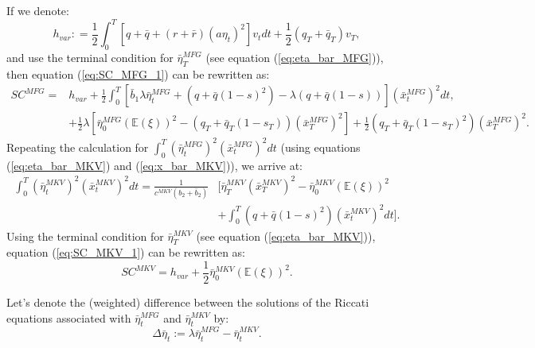 \documentclass[11pt]{article}
\begin{document}
If we denote:
\begin{equation*}
h_{var}: = \frac{1}{2}\int_0^T \left[q+\bar{q}+(r+\bar{r})(a\eta_t)^2\right]v_tdt + \frac{1}{2}(q_T+\bar{q}_T)v_T,
\end{equation*}
and use the terminal condition for $\bar{\eta}^{MFG}_T$ (see equation (\ref{eq:eta_bar_MFG})), then equation (\ref{eq:SC_MFG_1}) can be rewritten as:
\begin{equation}
\begin{split}
SC^{MFG} = & h_{var} +  \frac{1}{2} \int_0^T \left[ \bar{b}_1 \lambda \bar{\eta}_t^{MFG} + (q+ \bar{q}(1-s)^2) - \lambda (q + \bar{q}(1-s)) \right] (\bar{x}_t^{MFG})^2 dt, \\
& + \frac{1}{2} \lambda \left[ \bar{\eta}^{MFG}_0 (\mathbb{E}(\xi))^2 - (q_T+\bar{q}_T(1-s_T)) (\bar{x}_T^{MFG})^2 \right] + \frac{1}{2} (q_T+\bar{q}_T(1-s_T)^2)(\bar{x}_T^{MFG})^2.
\end{split}
\label{eq:SC_MFG_2}
\end{equation}
Repeating the calculation for $\int_0^T (\bar{\eta}^{MFG}_t)^2 (\bar{x}^{MFG}_t)^2 dt$ (using equations (\ref{eq:eta_bar_MKV}) and (\ref{eq:x_bar_MKV})), we arrive at:
\begin{equation*}
\begin{split}
\int_0^T (\bar{\eta}^{MKV}_t)^2 (\bar{x}^{MKV}_t)^2 dt=\frac{1}{c^{MKV}(b_2 + \bar{b}_2)} &\Bigg[ \bar{\eta}^{MKV}_T (\bar{x}^{MKV}_T)^2 - \bar{\eta}^{MKV}_0 (\mathbb{E}(\xi))^2 \\
&+ \int_0^T (q+\bar{q}(1-s)^2) (\bar{x}^{MKV}_t)^2 dt \Bigg].
\end{split}
\end{equation*}
Using the terminal condition for $\bar{\eta}^{MKV}_T$ (see equation (\ref{eq:eta_bar_MKV})), equation (\ref{eq:SC_MKV_1}) can be rewritten as:
\begin{equation}
SC^{MKV} = h_{var} + \frac{1}{2} \bar{\eta}^{MKV}_0 (\mathbb{E}(\xi))^2.
\label{eq:SC_MKV_2}
\end{equation}

Let's denote the (weighted) difference between the solutions of the Riccati equations associated with $\bar{\eta}_t^{MFG}$ and $\bar{\eta}_t^{MKV}$ by:
\begin{equation}
	\Delta \bar{\eta}_t := \lambda \bar{\eta}_t^{MFG} - \bar{\eta}_t^{MKV} .
\label{eq:delta_eta}
\end{equation} 
\end{document}

